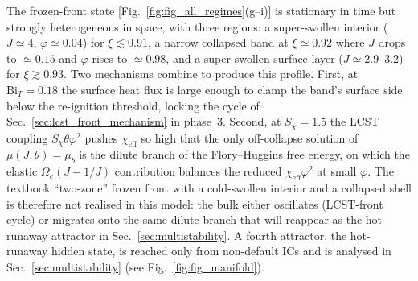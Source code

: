 \documentclass[aps,pre,reprint,superscriptaddress,longbibliography,floatfix]{revtex4-2}
\newcommand{\Bi}{\mathrm{Bi}}
\begin{document}
The frozen-front state [Fig.~\ref{fig:fig_all_regimes}(g--i)] is
stationary in time but strongly heterogeneous in space, with three
regions: a super-swollen interior ($J\!\simeq\!4$,
$\varphi\!\simeq\!0.04$) for $\xi\!\lesssim\!0.91$, a narrow
collapsed band at $\xi\!\simeq\!0.92$ where $J$ drops to
$\simeq\!0.15$ and $\varphi$ rises to $\simeq\!0.98$, and a
super-swollen surface layer ($J\!\simeq\!2.9$--$3.2$) for
$\xi\!\gtrsim\!0.93$.
Two mechanisms combine to produce this profile. First, at
$\Bi_T\!=\!0.18$ the surface heat flux is large enough to clamp the
band's surface side below the re-ignition threshold, locking the
cycle of Sec.~\ref{sec:lcst_front_mechanism} in phase~3. Second, at
$S_\chi\!=\!1.5$ the LCST coupling $S_\chi\theta\varphi^2$ pushes
$\chi_\mathrm{eff}$ so high that the only off-collapse solution of
$\mu(J,\theta)\!=\!\mu_b$ is the dilute branch of the
Flory--Huggins free energy, on which the elastic
$\Omega_e(J\!-\!1/J)$ contribution balances the reduced
$\chi_\mathrm{eff}\varphi^2$ at small $\varphi$. The textbook
``two-zone'' frozen front with a cold-swollen interior and a
collapsed shell is therefore not realised in this model: the bulk
either oscillates (LCST-front cycle) or migrates onto the same
dilute branch that will reappear as the hot-runaway attractor in
Sec.~\ref{sec:multistability}.  A fourth attractor, the hot-runaway hidden state, is
reached only from non-default ICs and is analysed in
Sec.~\ref{sec:multistability} (see Fig.~\ref{fig:fig_manifold}).
\end{document}
